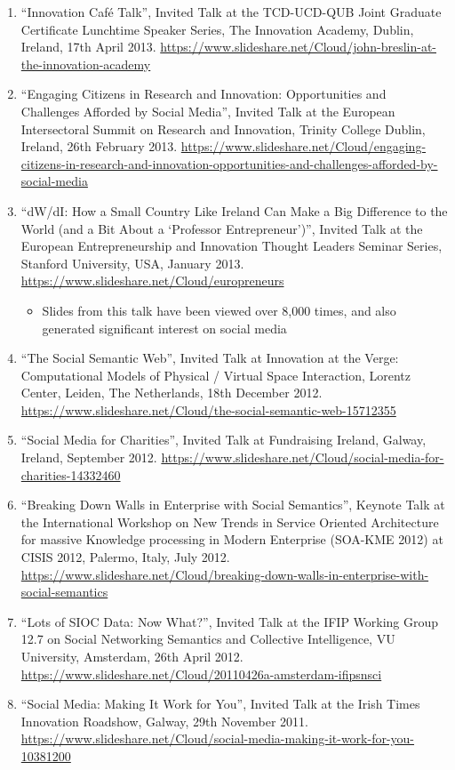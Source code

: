 \documentclass[10pt,a4paper]{res} %
\begin{document}
\begin{resume}
\begin{enumerate}
\item ``Innovation Caf\'{e} Talk'', Invited Talk at the TCD-UCD-QUB Joint Graduate Certificate Lunchtime Speaker Series, The Innovation Academy, Dublin, Ireland, 17th April 2013. \url{https://www.slideshare.net/Cloud/john-breslin-at-the-innovation-academy}
\item ``Engaging Citizens in Research and Innovation: Opportunities and Challenges Afforded by Social Media'', Invited Talk at the European Intersectoral Summit on Research and Innovation, Trinity College Dublin, Ireland, 26th February 2013. \url{https://www.slideshare.net/Cloud/engaging-citizens-in-research-and-innovation-opportunities-and-challenges-afforded-by-social-media}
\item ``dW/dI: How a Small Country Like Ireland Can Make a Big Difference to the World (and a Bit About a `Professor Entrepreneur')'', Invited Talk at the European Entrepreneurship and Innovation Thought Leaders Seminar Series, Stanford University, USA, January 2013. \url{https://www.slideshare.net/Cloud/europreneurs}
\begin{itemize} \itemsep -2pt
\item Slides from this talk have been viewed over 8,000 times, and also generated significant interest on social media
\end{itemize}
\item ``The Social Semantic Web'', Invited Talk at Innovation at the Verge: Computational Models of Physical / Virtual Space Interaction, Lorentz Center, Leiden, The Netherlands, 18th December 2012. \url{https://www.slideshare.net/Cloud/the-social-semantic-web-15712355}
\item ``Social Media for Charities'', Invited Talk at Fundraising Ireland, Galway, Ireland, September 2012. \url{https://www.slideshare.net/Cloud/social-media-for-charities-14332460}
\item ``Breaking Down Walls in Enterprise with Social Semantics'', Keynote Talk at the International Workshop on New Trends in Service Oriented Architecture for massive Knowledge processing in Modern Enterprise (SOA-KME 2012) at CISIS 2012, Palermo, Italy, July 2012. \url{https://www.slideshare.net/Cloud/breaking-down-walls-in-enterprise-with-social-semantics}
\item ``Lots of SIOC Data: Now What?'', Invited Talk at the IFIP Working Group 12.7 on Social Networking Semantics and Collective Intelligence, VU University, Amsterdam, 26th April 2012. \url{https://www.slideshare.net/Cloud/20110426a-amsterdam-ifipsnsci}
\item ``Social Media: Making It Work for You'', Invited Talk at the Irish Times Innovation Roadshow, Galway, 29th November 2011. \url{https://www.slideshare.net/Cloud/social-media-making-it-work-for-you-10381200}

\end{enumerate}
\end{resume}
\end{document}
